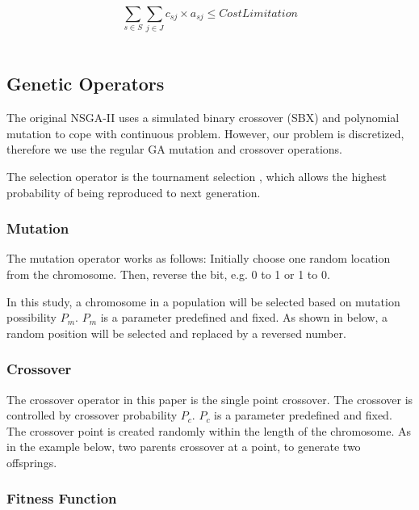\documentclass{llncs}
\begin{document}
{\centering
	\begin{equation}
		\sum\limits_{s \in S} \sum\limits_{j \in J} c_{sj} \times a_{sj} \leq CostLimitation
	\end{equation}
\\}


\subsection{Genetic Operators}
\label{sec:operators}
 The original NSGA-II uses a simulated 
binary crossover (SBX) \cite{930314} and polynomial mutation \cite{Raghuwanshi04} to cope with continuous problem. 
However, our problem is discretized, therefore we use the regular GA mutation and crossover operations.

The selection operator is the tournament selection \cite{Xie:2008:AMI:1389095.1389347}, which allows the highest probability 
of being reproduced to next generation.

\subsubsection{Mutation}
The mutation operator works as follows: Initially choose one random location from the chromosome. 
Then, reverse the bit, e.g. 0 to 1 or 1 to 0. 

In this study, a chromosome in a population will be selected based on mutation possibility $P_{m}$. $P_{m}$ is 
a parameter predefined and fixed.
As shown in below, a random position will be selected and replaced by a reversed number.
\subsubsection{Crossover}
The crossover operator in this paper is the single point crossover. 
The crossover is controlled by crossover probability $P_{c}$. $P_{c}$ is a parameter predefined and fixed.
The crossover point is created randomly within the length of the chromosome. 
As in the example below, two parents crossover at a point, to generate two offsprings.

\subsubsection{Fitness Function}
\end{document}
